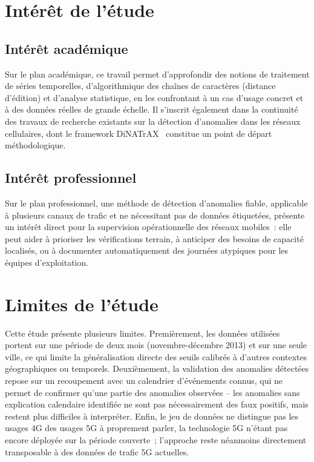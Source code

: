 \section{Intérêt de l'étude}

\subsection{Intérêt académique}

Sur le plan académique, ce travail permet d'approfondir des notions de
traitement de séries temporelles, d'algorithmique des chaînes de
caractères (distance d'édition) et d'analyse statistique, en les
confrontant à un cas d'usage concret et à des données réelles de
grande échelle. Il s'inscrit également dans la continuité des travaux
de recherche existants sur la détection d'anomalies dans les réseaux
cellulaires, dont le framework DiNATrAX~\parencite{maudoux2024dinatrax}
constitue un point de départ méthodologique.

\subsection{Intérêt professionnel}

Sur le plan professionnel, une méthode de détection d'anomalies
fiable, applicable à plusieurs canaux de trafic et ne nécessitant pas
de données étiquetées, présente un intérêt direct pour la supervision
opérationnelle des réseaux mobiles~: elle peut aider à prioriser les
vérifications terrain, à anticiper des besoins de capacité localisés,
ou à documenter automatiquement des journées atypiques pour les
équipes d'exploitation.

\section{Limites de l'étude}

Cette étude présente plusieurs limites. Premièrement, les données
utilisées portent sur une période de deux mois (novembre-décembre
2013) et sur une seule ville, ce qui limite la généralisation directe
des seuils calibrés à d'autres contextes géographiques ou temporels.
Deuxièmement, la validation des anomalies détectées repose sur un
recoupement avec un calendrier d'événements connus, qui ne permet de
confirmer qu'une partie des anomalies observées -- les anomalies sans
explication calendaire identifiée ne sont pas nécessairement des faux
positifs, mais restent plus difficiles à interpréter. Enfin, le jeu de
données ne distingue pas les usages 4G des usages 5G à proprement
parler, la technologie 5G n'étant pas encore déployée sur la période
couverte~; l'approche reste néanmoins directement transposable à des
données de trafic 5G actuelles.
